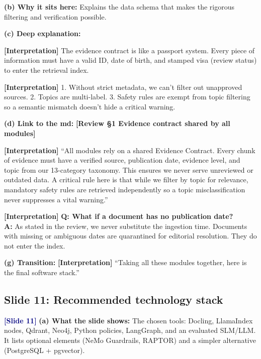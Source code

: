 \documentclass[11pt,a4paper]{article}
\newcommand{\origintag}[2]{\textcolor{#1}{\small\textbf{[#2]}}}
\begin{document}
\textbf{(b) Why it sits here:} Explains the data schema that makes the rigorous filtering and verification possible.

\textbf{(c) Deep explanation:}
\begin{analogy}
\origintag{slate}{Interpretation} The evidence contract is like a passport system. Every piece of information must have a valid ID, date of birth, and stamped visa (review status) to enter the retrieval index.
\end{analogy}
\origintag{slate}{Interpretation} 1. Without strict metadata, we can't filter out unapproved sources. 2. Topics are multi-label. 3. Safety rules are exempt from topic filtering so a semantic mismatch doesn't hide a critical warning.

\textbf{(d) Link to the md:} \origintag{amber}{Review \S1 Evidence contract shared by all modules}

\begin{sayit}
\origintag{slate}{Interpretation} ``All modules rely on a shared Evidence Contract. Every chunk of evidence must have a verified source, publication date, evidence level, and topic from our 13-category taxonomy. This ensures we never serve unreviewed or outdated data. A critical rule here is that while we filter by topic for relevance, mandatory safety rules are retrieved independently so a topic misclassification never suppresses a vital warning.''
\end{sayit}

\begin{qa}
\origintag{slate}{Interpretation} \textbf{Q: What if a document has no publication date?} \\
\textbf{A:} As stated in the review, we never substitute the ingestion time. Documents with missing or ambiguous dates are quarantined for editorial resolution. They do not enter the index.
\end{qa}
\textbf{(g) Transition:} \origintag{slate}{Interpretation} ``Taking all these modules together, here is the final software stack.''

\subsection{Slide 11: Recommended technology stack}
\origintag{navy}{Slide 11}
\textbf{(a) What the slide shows:} The chosen tools: Docling, LlamaIndex nodes, Qdrant, Neo4j, Python policies, LangGraph, and an evaluated SLM/LLM. It lists optional elements (NeMo Guardrails, RAPTOR) and a simpler alternative (PostgreSQL + pgvector).
\end{document}
